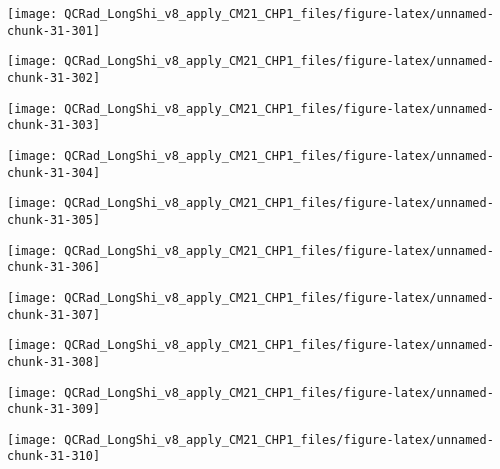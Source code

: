 \documentclass[
  10pt,
  a4paper,oneside]{article}
\begin{document}
\begin{center}\texttt{[image: QCRad\_LongShi\_v8\_apply\_CM21\_CHP1\_files/figure-latex/unnamed-chunk-31-301]} \end{center}

\begin{center}\texttt{[image: QCRad\_LongShi\_v8\_apply\_CM21\_CHP1\_files/figure-latex/unnamed-chunk-31-302]} \end{center}

\begin{center}\texttt{[image: QCRad\_LongShi\_v8\_apply\_CM21\_CHP1\_files/figure-latex/unnamed-chunk-31-303]} \end{center}

\begin{center}\texttt{[image: QCRad\_LongShi\_v8\_apply\_CM21\_CHP1\_files/figure-latex/unnamed-chunk-31-304]} \end{center}

\begin{center}\texttt{[image: QCRad\_LongShi\_v8\_apply\_CM21\_CHP1\_files/figure-latex/unnamed-chunk-31-305]} \end{center}

\begin{center}\texttt{[image: QCRad\_LongShi\_v8\_apply\_CM21\_CHP1\_files/figure-latex/unnamed-chunk-31-306]} \end{center}

\begin{center}\texttt{[image: QCRad\_LongShi\_v8\_apply\_CM21\_CHP1\_files/figure-latex/unnamed-chunk-31-307]} \end{center}

\begin{center}\texttt{[image: QCRad\_LongShi\_v8\_apply\_CM21\_CHP1\_files/figure-latex/unnamed-chunk-31-308]} \end{center}

\begin{center}\texttt{[image: QCRad\_LongShi\_v8\_apply\_CM21\_CHP1\_files/figure-latex/unnamed-chunk-31-309]} \end{center}

\begin{center}\texttt{[image: QCRad\_LongShi\_v8\_apply\_CM21\_CHP1\_files/figure-latex/unnamed-chunk-31-310]} \end{center}
\end{document}
